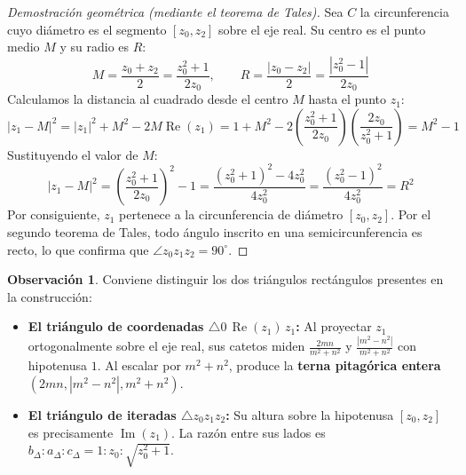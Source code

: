 \documentclass[11pt,a4paper]{article}
\theoremstyle{plain}
\theoremstyle{definition}
\newtheorem{observacion}{Observación}
\begin{document}
\begin{proof}[Demostración geométrica (mediante el teorema de Tales)]
Sea $C$ la circunferencia cuyo diámetro es el segmento $[z_0, z_2]$ sobre el eje real. Su centro es el punto medio $M$ y su radio es $R$:
\[
M = \frac{z_0 + z_2}{2} = \frac{z_0^2 + 1}{2z_0}, \qquad R = \frac{|z_0 - z_2|}{2} = \frac{|z_0^2 - 1|}{2z_0}
\]
Calculamos la distancia al cuadrado desde el centro $M$ hasta el punto $z_1$:
\[
|z_1 - M|^2 = |z_1|^2 + M^2 - 2M\operatorname{Re}(z_1) 
            = 1 + M^2 - 2\left(\frac{z_0^2 + 1}{2z_0}\right)\left(\frac{2z_0}{z_0^2 + 1}\right) 
            = M^2 - 1
\]
Sustituyendo el valor de $M$:
\[
|z_1 - M|^2 = \left(\frac{z_0^2 + 1}{2z_0}\right)^2 - 1 = \frac{(z_0^2 + 1)^2 - 4z_0^2}{4z_0^2} = \frac{(z_0^2 - 1)^2}{4z_0^2} = R^2
\]
Por consiguiente, $z_1$ pertenece a la circunferencia de diámetro $[z_0, z_2]$. Por el segundo teorema de Tales, todo ángulo inscrito en una semicircunferencia es recto, lo que confirma que $\angle z_0 z_1 z_2 = 90^\circ$.
\end{proof}

\begin{observacion}
Conviene distinguir los dos triángulos rectángulos presentes en la construcción:
\begin{itemize}
    \item \textbf{El triángulo de coordenadas $\triangle 0\,\operatorname{Re}(z_1)\,z_1$:} Al proyectar $z_1$ ortogonalmente sobre el eje real, sus catetos miden $\frac{2mn}{m^2+n^2}$ y $\frac{|m^2-n^2|}{m^2+n^2}$ con hipotenusa $1$. Al escalar por $m^2+n^2$, produce la \textbf{terna pitagórica entera} $(2mn, |m^2-n^2|, m^2+n^2)$.
    \item \textbf{El triángulo de iteradas $\triangle z_0 z_1 z_2$:} Su altura sobre la hipotenusa $[z_0, z_2]$ es precisamente $\operatorname{Im}(z_1)$. La razón entre sus lados es $b_{\Delta} : a_{\Delta} : c_{\Delta} = 1 : z_0 : \sqrt{z_0^2 + 1}$.
\end{itemize}
\end{observacion}
\end{document}
